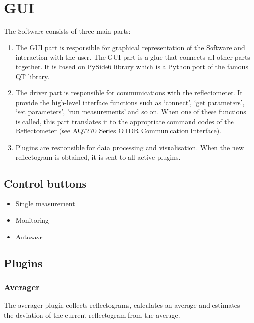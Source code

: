\chapter{GUI}

The Software consists of three main parts:
\begin{enumerate}
	\item The GUI part is responsible for graphical representation of the Software and interaction with the user. The GUI part is a glue that connects all other parts together. It is based on PySide6 library which is a Python port of the famous QT library.

	\item The driver part is responsible for communications with the reflectometer. It provide the high-level interface functions such as `connect', `get parameters', `set parameters', 'run measurements' and so on. When one of these functions is called, this part translates it to the appropriate command codes of the Reflectometer (see AQ7270 Series OTDR
	Communication Interface).
	

	\item Plugins are responsible for data processing and visualisation. When the new reflectogram is obtained, it is sent to all active plugins. 
\end{enumerate}


\section{Control buttons}

\begin{itemize}
	\item Single measurement
	\item Monitoring
	\item Autosave
\end{itemize}


\section{Plugins}

\subsection{Averager}

	The averager plugin collects reflectograms, calculates an average and estimates the deviation of the current reflectogram from the average.
	
